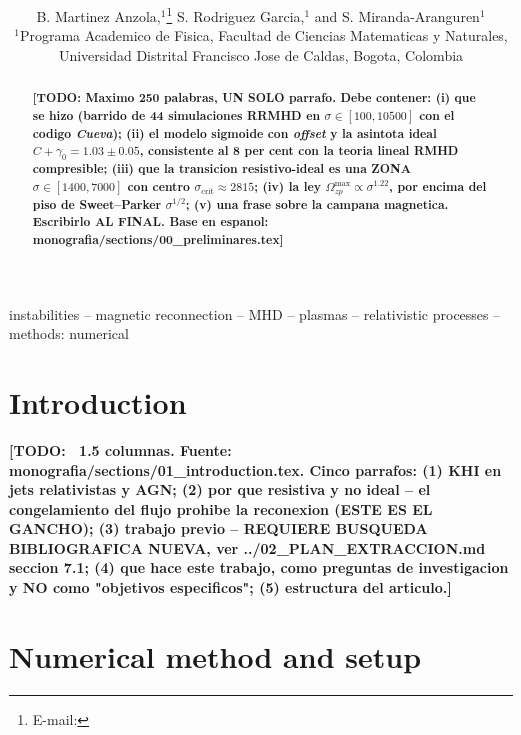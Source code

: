 \documentclass[fleqn,usenatbib]{mnras}
\title[Resistive KHI in RRMHD]{%
  \todo{titulo completo}%
}
\author[B. Martinez Anzola et al.]{%
  B. Martinez Anzola,$^{1}$\thanks{E-mail: \todo{correo}}
  S. Rodriguez Garcia,$^{1}$
  and S. Miranda-Aranguren$^{1}$
  \\
  $^{1}$Programa Academico de Fisica, Facultad de Ciencias Matematicas y
  Naturales, Universidad Distrital Francisco Jose de Caldas,
  Bogota, Colombia\\
}
\date{\todo{fecha}}
\newcommand{\scrit}{\sigma_{\mathrm{crit}}}
\newcommand{\Omaxzp}{\Omega_{zp}^{\max}}
\newcommand{\todo}[1]{\textbf{[TODO: #1]}}
\begin{document}
\label{firstpage}
\pagerange{\pageref{firstpage}--\pageref{lastpage}}
\maketitle

\begin{abstract}
\todo{Maximo 250 palabras, UN SOLO parrafo. Debe contener: (i) que se hizo
(barrido de 44 simulaciones RRMHD en $\sigma\in[100,10500]$ con el codigo
\textit{Cueva}); (ii) el modelo sigmoide con \emph{offset} y la asintota ideal
$C+\gamma_0=1.03\pm0.05$, consistente al 8 per cent con la teoria lineal RMHD
compresible; (iii) que la transicion resistivo-ideal es una ZONA
$\sigma\in[1400,7000]$ con centro $\scrit\approx2815$; (iv) la ley
$\Omaxzp\propto\sigma^{1.22}$, por encima del piso de Sweet--Parker
$\sigma^{1/2}$; (v) una frase sobre la campana magnetica. Escribirlo AL FINAL.
Base en espanol: monografia/sections/00\_preliminares.tex}
\end{abstract}

\begin{keywords}
instabilities -- magnetic reconnection -- MHD -- plasmas --
relativistic processes -- methods: numerical
\end{keywords}

\section{Introduction}
\label{sec:intro}

\todo{~1.5 columnas. Fuente: monografia/sections/01\_introduction.tex.
Cinco parrafos: (1) KHI en jets relativistas y AGN; (2) por que resistiva y no
ideal -- el congelamiento del flujo prohibe la reconexion (ESTE ES EL GANCHO);
(3) trabajo previo -- REQUIERE BUSQUEDA BIBLIOGRAFICA NUEVA, ver
../02\_PLAN\_EXTRACCION.md seccion 7.1; (4) que hace este trabajo, como
preguntas de investigacion y NO como "objetivos especificos"; (5) estructura
del articulo.}

\section{Numerical method and setup}
\label{sec:method}
\end{document}
